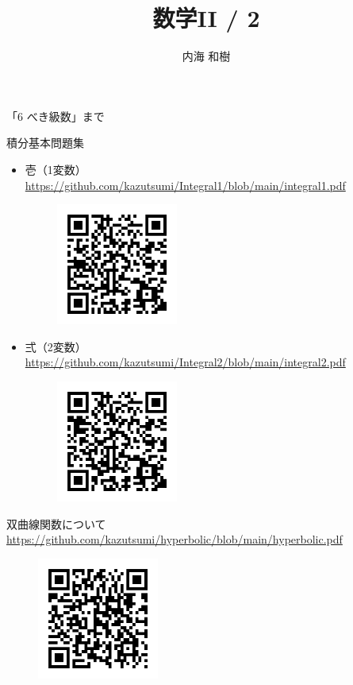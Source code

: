 \documentclass[10pt, uplatex, dvipdfmx]{jsarticle}
\title{\Huge 数学II / 2}
\author{\Large 内海 和樹}
\theoremstyle{definition}
\numberwithin{equation}{section}
\begin{document}
\maketitle

\begin{center}
  「6 べき級数」まで
\end{center}


\thispagestyle{empty}

\clearpage

\begin{center}
  {\LARGE 積分基本問題集}

  \begin{itemize}
    
  \item 壱（1変数） \url{https://github.com/kazutsumi/Integral1/blob/main/integral1.pdf}
    \begin{figure}[h]
      \centering
      \includegraphics[width=4cm]{./pictures/QR/1.png}
    \end{figure}
    
  \item 弍（2変数） \url{https://github.com/kazutsumi/Integral2/blob/main/integral2.pdf}
    \begin{figure}[h]
      \centering
      \includegraphics[width=4cm]{./pictures/QR/2.png}
    \end{figure}
  \end{itemize}

  \vspace{2zh}

  {\LARGE 双曲線関数について}
  \url{https://github.com/kazutsumi/hyperbolic/blob/main/hyperbolic.pdf}
      \begin{figure}[h]
      \centering
      \includegraphics[width=4cm]{./pictures/QR/hyperbolic.png}
    \end{figure}

\end{center}
\end{document}
